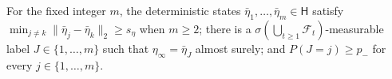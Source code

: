 For the fixed integer \(m\), the deterministic states \(\bar\eta_1,\ldots,\bar\eta_m\in\mathsf H\) satisfy \(\min_{j\ne k}\|\bar\eta_j-\bar\eta_k\|_2\ge s_\eta\) when \(m\ge2\); there is a \(\sigma(\bigcup_{t\ge1}\mathcal F_t)\)-measurable label \(J\in\{1,\ldots,m\}\) such that \(\eta_\infty=\bar\eta_J\) almost surely; and \(P(J=j)\ge p_-\) for every \(j\in\{1,\ldots,m\}\).